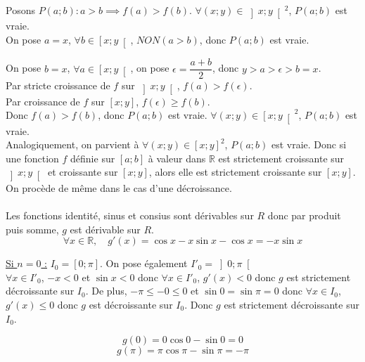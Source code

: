 \documentclass[a4paper,french,bookmarks]{article}
\begin{document}
\begin{enumerate}
\begin{enumerate}
\begin{tcolorbox}[colback=black!3,colframe=black!9,boxrule=.25pt,enhanced,arc is angular,arc=0pt]
    Posons $P\left(a;b\right): a > b \implies f\left(a\right) > f\left(b\right)$.
    $\forall \left(x;y\right) \in \left]x;y\right[^2$, $P\left(a;b\right)$ est vraie.\\
    On pose $a = x$, $\forall b \in \left[x;y\right[$, $NON\left(a > b\right)$, donc $P\left(a;b\right)$ est vraie.
    
    On pose $b = x$, $\forall a \in \left[x;y\right[$, on pose $\epsilon = \dfrac{a+b}{2}$, donc $y > a > \epsilon > b = x$.\\
    Par stricte croissance de $f$ sur $\left]x;y\right[$, $f\left(a\right) > f\left(\epsilon\right)$.\\
    Par croissance de $f$ sur $\left[x;y\right]$, $f\left(\epsilon\right) \geq f\left(b\right)$.\\
    Donc $f\left(a\right) > f\left(b\right)$, donc $P\left(a;b\right)$ est vraie. $\forall \left(x;y\right) \in \left[x;y\right[^2$, $P\left(a;b\right)$ est vraie.\\
    
    Analogiquement, on parvient à $\forall \left(x;y\right) \in \left[x;y\right]^2$, $P\left(a;b\right)$ est vraie. Donc si une fonction $f$ définie sur $\left[a;b\right]$ à valeur dans $\mathbb{R}$ est strictement croissante sur $\left]x;y\right[$ et croissante sur $\left[x;y\right]$, alors elle est strictement croissante sur $\left[x;y\right]$. On procède de même dans le cas d'une décroissance.\\
    \\

    Les fonctions identité, sinus et consius sont dérivables sur $R$ donc par produit puis somme, $g$ est dérivable sur $R$.
    \[ \forall x \in \mathbb{R}, \quad g'(x) = \cos x - x\sin x - \cos x = - x\sin x\]
    
    \underline{Si $n = 0$ :} $I_0 = \left[0; \pi\right]$. On pose également $I'_0 = \left]0; \pi\right[$\\
        $\forall x \in I'_0$, $-x < 0$ et $\sin x < 0$ donc $\forall x \in I'_0$, $g'(x) < 0$ donc $g$ est strictement décroissante sur $I_0$. De plus, $-\pi \leq -0 \leq 0$ et $\sin 0 = \sin \pi = 0$ donc $\forall x \in I_0$, $g'(x) \leq 0$ donc $g$ est décroissante sur $I_0$. Donc $g$ est strictement décroissante sur $I_0$.
    
    \[g(0)=0\cos 0 - \sin 0 = 0\]
    \[g(\pi)=\pi\cos\pi-\sin\pi=-\pi\]
          \end{tcolorbox}
       \begin{tcolorbox}[colback=black!3,colframe=black!9,boxrule=.25pt,enhanced,arc is angular,arc=0pt]
    \begin{tikzpicture}


\end{tikzpicture}
\end{tcolorbox}
\end{enumerate}
\end{enumerate}
\end{document}
